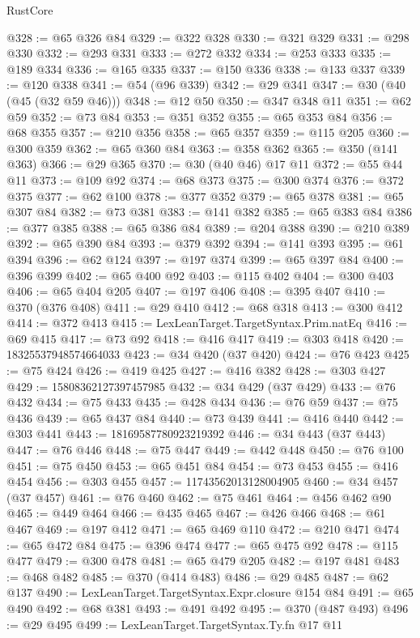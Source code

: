 \begin{lexlean}{RustCore}
\begin{coremodule}
@328 := @65 @326 @84
@329 := @322 @328
@330 := @321 @329
@331 := @298 @330
@332 := @293 @331
@333 := @272 @332
@334 := @253 @333
@335 := @189 @334
@336 := @165 @335
@337 := @150 @336
@338 := @133 @337
@339 := @120 @338
@341 := @54 (@96 @339)
@342 := @29 @341
@347 := @30 (@40 (@45 (@32 @59 @46)))
@348 := @12 @50
@350 := @347 @348 @11
@351 := @62 @59
@352 := @73 @84
@353 := @351 @352
@355 := @65 @353 @84
@356 := @68 @355
@357 := @210 @356
@358 := @65 @357
@359 := @115 @205
@360 := @300 @359
@362 := @65 @360 @84
@363 := @358 @362
@365 := @350 (@141 @363)
@366 := @29 @365
@370 := @30 (@40 @46) @17 @11
@372 := @55 @44 @11
@373 := @109 @92
@374 := @68 @373
@375 := @300 @374
@376 := @372 @375
@377 := @62 @100
@378 := @377 @352
@379 := @65 @378
@381 := @65 @307 @84
@382 := @73 @381
@383 := @141 @382
@385 := @65 @383 @84
@386 := @377 @385
@388 := @65 @386 @84
@389 := @204 @388
@390 := @210 @389
@392 := @65 @390 @84
@393 := @379 @392
@394 := @141 @393
@395 := @61 @394
@396 := @62 @124
@397 := @197 @374
@399 := @65 @397 @84
@400 := @396 @399
@402 := @65 @400 @92
@403 := @115 @402
@404 := @300 @403
@406 := @65 @404 @205
@407 := @197 @406
@408 := @395 @407
@410 := @370 (@376 @408)
@411 := @29 @410
@412 := @68 @318
@413 := @300 @412
@414 := @372 @413
@415 := LexLeanTarget.TargetSyntax.Prim.natEq
@416 := @69 @415
@417 := @73 @92
@418 := @416 @417
@419 := @303 @418
@420 := 18325537948574664033
@423 := @34 @420 (@37 @420)
@424 := @76 @423
@425 := @75 @424
@426 := @419 @425
@427 := @416 @382
@428 := @303 @427
@429 := 15808362127397457985
@432 := @34 @429 (@37 @429)
@433 := @76 @432
@434 := @75 @433
@435 := @428 @434
@436 := @76 @59
@437 := @75 @436
@439 := @65 @437 @84
@440 := @73 @439
@441 := @416 @440
@442 := @303 @441
@443 := 18169587780923219392
@446 := @34 @443 (@37 @443)
@447 := @76 @446
@448 := @75 @447
@449 := @442 @448
@450 := @76 @100
@451 := @75 @450
@453 := @65 @451 @84
@454 := @73 @453
@455 := @416 @454
@456 := @303 @455
@457 := 11743562013128004905
@460 := @34 @457 (@37 @457)
@461 := @76 @460
@462 := @75 @461
@464 := @456 @462 @90
@465 := @449 @464
@466 := @435 @465
@467 := @426 @466
@468 := @61 @467
@469 := @197 @412
@471 := @65 @469 @110
@472 := @210 @471
@474 := @65 @472 @84
@475 := @396 @474
@477 := @65 @475 @92
@478 := @115 @477
@479 := @300 @478
@481 := @65 @479 @205
@482 := @197 @481
@483 := @468 @482
@485 := @370 (@414 @483)
@486 := @29 @485
@487 := @62 @137
@490 := LexLeanTarget.TargetSyntax.Expr.closure @154 @84
@491 := @65 @490
@492 := @68 @381
@493 := @491 @492
@495 := @370 (@487 @493)
@496 := @29 @495
@499 := LexLeanTarget.TargetSyntax.Ty.fn @17 @11

\end{coremodule}
\end{lexlean}
